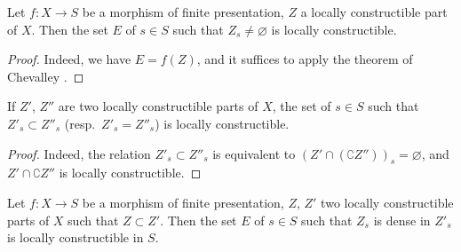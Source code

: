 \begin{proposition}[9.5.1]
\label{IV.9.5.1}
Let $f:X\to S$ be a morphism of finite presentation, $Z$ a locally constructible part of $X$.
Then the set $E$ of $s\in S$ such that $Z_s\neq\varnothing$ is locally constructible.
\end{proposition}

\begin{proof}
Indeed, we have $E=f(Z)$, and it suffices to apply the theorem of Chevalley .
\end{proof}

\begin{corollary}[9.5.2]
\label{IV.9.5.2}
If $Z'$, $Z''$ are two locally constructible parts of $X$, the set of $s\in S$ such that $Z'_s\subset Z''_s$ (resp.\ $Z'_s=Z''_s$) is locally constructible.
\end{corollary}

\begin{proof}
Indeed, the relation $Z'_s\subset Z''_s$ is equivalent to $(Z'\cap(\complement Z''))_s=\varnothing$, and $Z'\cap\complement Z''$ is locally constructible.
\end{proof}

\begin{proposition}[9.5.3]
\label{IV.9.5.3}
Let $f:X\to S$ be a morphism of finite presentation, $Z$, $Z'$ two locally constructible parts of $X$ such that $Z\subset Z'$.
Then the set $E$ of $s\in S$ such that $Z_s$ is dense in $Z'_s$ is locally constructible in $S$.
\end{proposition}

